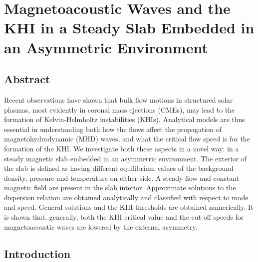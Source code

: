 
\chapter{Magnetoacoustic Waves and the KHI in a Steady Slab Embedded in an Asymmetric Environment}

\section*{Abstract}

\let\thefootnote\relax{}

Recent observations have shown that bulk flow motions in structured solar plasmas, most evidently in coronal mass ejections (CMEs), may lead to the formation of Kelvin-Helmholtz instabilities (KHIs).
Analytical models are thus essential in understanding both how the flows affect the propagation of magnetohydrodynamic (MHD) waves, and what the critical flow speed is for the formation of the KHI.
We investigate both these aspects in a novel way: in a steady magnetic slab embedded in an asymmetric environment.
The exterior of the slab is defined as having different equilibrium values of the background density, pressure and temperature on either side.
A steady flow and constant magnetic field are present in the slab interior.
Approximate solutions to the dispersion relation are obtained analytically and classified with respect to mode and speed. General solutions and the KHI thresholds are obtained numerically.
It is shown that, generally, both the KHI critical value and the cut-off speeds for magnetoacoustic waves are lowered by the external asymmetry.



\section{Introduction}
\label{sec:c2intro}

